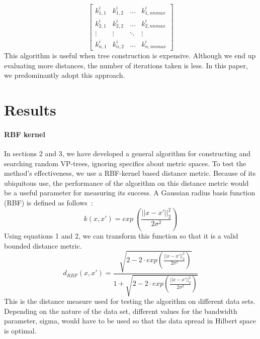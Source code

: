 \documentclass[11pt]{article}
\begin{document}
\begin{enumerate}
\begin{equation}
\begin{bmatrix}
k^{i}_{1,1} & k^{i}_{1,2} & \dots & k^{i}_{1,nnmax} \\
k^{i}_{2,1} & k^{i}_{2,2} & \dots & k^{i}_{2,nnmax} \\
\vdots   & \vdots   & \ddots & \vdots \\
k^{i}_{n,1} & k^{i}_{n,2} & \dots & k^{i}_{n,nnmax}
\end{bmatrix}
\end{equation}
This algorithm is useful when tree construction is expensive. Although we end up evaluating more distances, the number of iterations taken is less. In this paper, we predominantly adopt this approach. 
\end{enumerate}

\section{Results}
\paragraph{RBF kernel} In sections 2 and 3, we have developed a general algorithm for constructing and searching random VP-trees, ignoring specifics about metric spaces. To test the method's effectiveness, we use a RBF-kernel based distance metric. Because of its ubiquitous use, the performance of the algorithm on this distance metric would be a useful parameter for measuring its success. A Gaussian radius basis function (RBF) is defined as follows~\cite{Tsuda04}:
\begin{equation}
k(x,x') = exp\ \left(\frac{||x-x'||_2^2}{2\sigma^2}\right)
\end{equation}
Using equations 1 and 2, we can transform this function so that it is a valid bounded distance metric. 
\begin{equation}
d_{RBF}(x,x') = \frac{\sqrt{2 - 2\cdot exp\left(\frac{||x-x'||_2^2}{2\sigma^2}\right)}}{1 + \sqrt{2 - 2\cdot exp\left(\frac{||x-x'||_2^2}{2\sigma^2}\right)}}
\end{equation}
This is the distance measure used for testing the algorithm on different data sets. Depending on the nature of the data set, different values for the bandwidth parameter, sigma, would have to be used so that the data spread in Hilbert space is optimal. 
\end{document}
